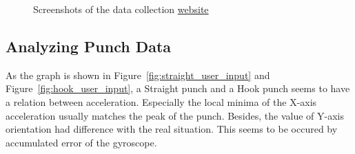 \documentclass{article}
\begin{document}
\begin{figure}[ht]
\begin{subfigure}
            \caption{A screen for viewing recorded punch data}
            \label{fig:data_collection_web_info}
        \end{subfigure}
        \caption{Screenshots of the data collection
        \href{https://punch-boxing.github.io/punch-data-collection-web/}{website}}
        \label{fig:data_collection_web_screenshots}
    \end{figure}

    \FloatBarrier
    \subsection{Analyzing Punch Data}
    As the graph is shown in Figure~\ref{fig:straight_user_input} and Figure~\ref{fig:hook_user_input},
    a Straight punch and a Hook punch seems to have a relation between
    acceleration. Especially the local minima of the X-axis acceleration usually
    matches the peak of the punch. Besides, the value of Y-axis orientation had difference
    with the real situation. This seems to be occured by accumulated error of
    the gyroscope.
\end{document}
